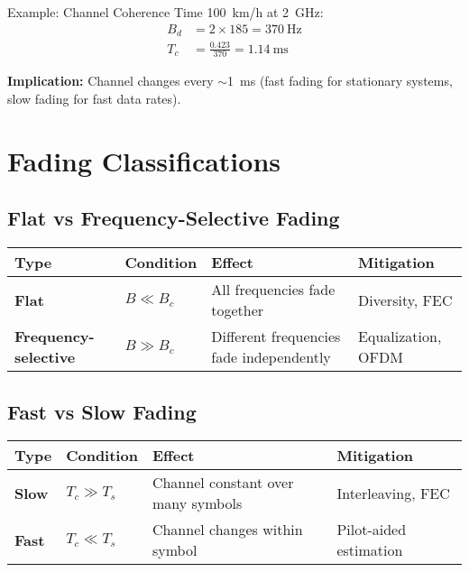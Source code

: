 \begin{calloutbox}{Example: Channel Coherence Time}
100~km/h at 2~GHz:
\begin{align*}
B_d &= 2 \times 185 = 370~\text{Hz} \\
T_c &= \frac{0.423}{370} = 1.14~\text{ms}
\end{align*}

\textbf{Implication:} Channel changes every $\sim$1~ms (fast fading for stationary systems, slow fading for fast data rates).
\end{calloutbox}

\section{Fading Classifications}

\subsection{Flat vs Frequency-Selective Fading}

\begin{center}
\begin{tabular}{@{}llll@{}}
\toprule
\textbf{Type} & \textbf{Condition} & \textbf{Effect} & \textbf{Mitigation} \\
\midrule
\textbf{Flat} & $B \ll B_c$ & All frequencies fade together & Diversity, FEC \\
\textbf{Frequency-selective} & $B \gg B_c$ & Different frequencies fade independently & Equalization, OFDM \\
\bottomrule
\end{tabular}
\end{center}

\subsection{Fast vs Slow Fading}

\begin{center}
\begin{tabular}{@{}llll@{}}
\toprule
\textbf{Type} & \textbf{Condition} & \textbf{Effect} & \textbf{Mitigation} \\
\midrule
\textbf{Slow} & $T_c \gg T_s$ & Channel constant over many symbols & Interleaving, FEC \\
\textbf{Fast} & $T_c \ll T_s$ & Channel changes within symbol & Pilot-aided estimation \\
\bottomrule
\end{tabular}
\end{center}


